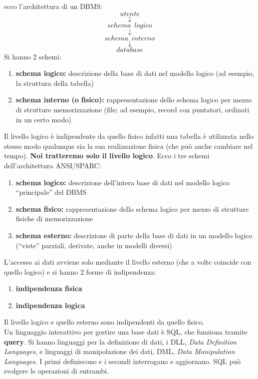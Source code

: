 \documentclass[a4paper,12pt, oneside]{book}
\begin{document}
ecco l'architettura di un DBMS:
$$utente$$
$$\downarrow$$
$$schema\,\,\,logico$$
$$\downarrow$$
$$schema\,\,\,interno$$
$$\downarrow$$
$$database$$
Si hanno 2 schemi:
\begin{enumerate}
\item \textbf{schema logico:} descrizione della base
di dati nel modello logico (ad esempio,
la struttura della tabella)
\item \textbf{schema interno (o fisico):}
rappresentazione dello schema logico
per mezzo di strutture memorizzazione
(file; ad esempio, record con puntatori,
ordinati in un certo modo)
\end{enumerate}
Il livello logico è indipendente da quello
fisico infatti una tabella è utilizzata nello stesso modo
qualunque sia la sua realizzazione fisica
(che può anche cambiare nel tempo). \textbf{Noi tratteremo solo il livello logico}.
Ecco i tre schemi dell'architettura ANSI/SPARC:
\begin{enumerate}
\item \textbf{schema logico: }descrizione dell'intera base di
dati nel modello logico “principale” del DBMS
\item \textbf{schema fisico: }rappresentazione dello
schema logico per mezzo di strutture fisiche
di memorizzazione
\item\textbf{ schema esterno:} descrizione di parte della
base di dati in un modello logico (“viste”
parziali, derivate, anche in modelli diversi)
\end{enumerate}
L'accesso ai dati avviene solo mediante il livello esterno (che a volte coincide con quello logico) e si hanno 2 forme di indipendenza:
\begin{enumerate}
\item \textbf{indipendenza fisica} 
\item \textbf{indipendenza logica}
\end{enumerate}
Il livello logico e quello esterno sono
indipendenti da quello fisico.\\
Un linguaggio interattivo per gestire una base dati è SQL, che funziona tramite \textbf{query}. Si hanno linguaggi per la definizione di dati, i DLL, \textit{Data Definition Languages}, e linguaggi di manipolazione dei dati, DML, \textit{Data Manipulation Languages}. I primi definiscono e i secondi interrogano e aggiornano. SQL può svolgere le operazioni di entrambi.
\end{document}
